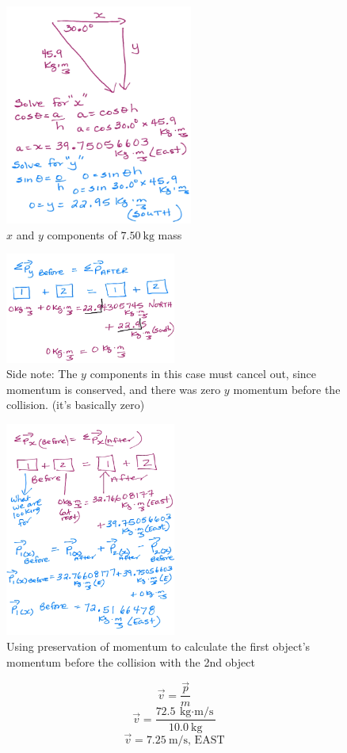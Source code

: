 \documentclass[a4paper,12pt]{article}
\begin{document}
\begin{figure}[H]
    \centering
    \caption{$x$ and $y$ components of $\SI{7.50}{\kg}$ mass}
    \includegraphics[width=0.55\textwidth]{q-glance-1c}
\end{figure}
\begin{figure}[H]
    \centering
    \caption{Side note: The $y$ components in this case must cancel out, since momentum is conserved, and there was zero $y$ momentum before the collision. (it's basically zero)}
    \includegraphics[width=0.50\textwidth]{q-glance-1d}
\end{figure}
\begin{figure}[H]
    \centering
    \caption{Using preservation of momentum to calculate the first object's momentum before the collision with the 2nd object}
    \includegraphics[width=0.50\textwidth]{q-glance-1e}
\end{figure}
$$\vec{v} = \frac{\vec{p}}{m}$$
$$\vec{v} = \frac{\SI{72.5}{\kg\cdot\m\per\s}}{\SI{10.0}{\kg}}$$
$$\vec{v} = \SI{7.25}{\m\per\s}\textrm{, EAST}$$
\end{document}
